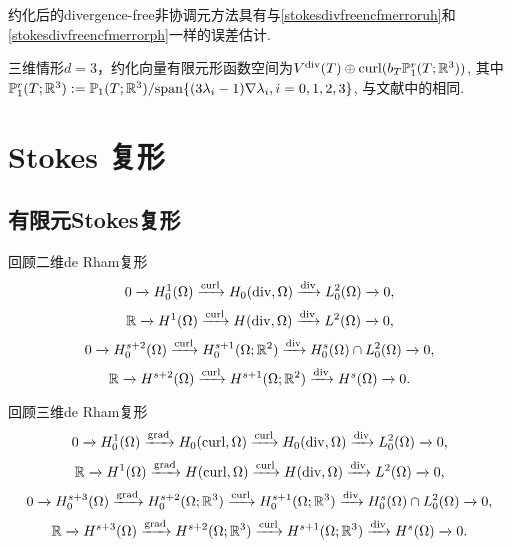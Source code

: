 约化后的divergence-free非协调元方法具有与\eqref{stokesdivfreencfmerroruh}和\eqref{stokesdivfreencfmerrorph}一样的误差估计.

三维情形$d=3$，约化向量有限元形函数空间为$V^{\operatorname{div}}(T)\oplus\operatorname{curl}(b_T\mathbb P_1^r(T;\mathbb R^3))$, 其中$\mathbb P_1^r(T;\mathbb R^3):=\mathbb P_1(T;\mathbb R^3)/{\rm span}\{(3\lambda_i-1)\nabla\lambda_i, i=0,1,2,3\}$, 与文献\cite{XieXuXue2008}中的相同.




\section{ Stokes 复形}
\subsection{有限元Stokes复形}
回顾二维de Rham复形
\begin{equation*}
0\xrightarrow{} H_0^1(\Omega)\xrightarrow{\operatorname{curl}} H_0(\operatorname{div},\Omega)\xrightarrow{\operatorname{div}} L_0^2(\Omega)\xrightarrow{}0,
\end{equation*}
\begin{equation*}
\mathbb R\xrightarrow{} H^1(\Omega)\xrightarrow{\operatorname{curl}} H(\operatorname{div},\Omega)\xrightarrow{\operatorname{div}} L^2(\Omega)\xrightarrow{}0,
\end{equation*}
\begin{equation*}
0\xrightarrow{} H_0^{s+2}(\Omega)\xrightarrow{\operatorname{curl}} H_0^{s+1}(\Omega;\mathbb R^2)\xrightarrow{\operatorname{div}} H_0^s(\Omega)\cap L_0^2(\Omega)\xrightarrow{}0,
\end{equation*}
\begin{equation*}
\mathbb R\xrightarrow{} H^{s+2}(\Omega)\xrightarrow{\operatorname{curl}} H^{s+1}(\Omega;\mathbb R^2)\xrightarrow{\operatorname{div}} H^s(\Omega)\xrightarrow{}0.
\end{equation*}


回顾三维de Rham复形
\begin{equation*}
0\xrightarrow{} H_0^1(\Omega)\xrightarrow{\operatorname{grad}} H_0(\operatorname{curl},\Omega)\xrightarrow{\operatorname{curl}} H_0(\operatorname{div},\Omega)\xrightarrow{\operatorname{div}} L_0^2(\Omega)\xrightarrow{}0,
\end{equation*}
\begin{equation*}
\mathbb R\xrightarrow{} H^1(\Omega)\xrightarrow{\operatorname{grad}} H(\operatorname{curl},\Omega)\xrightarrow{\operatorname{curl}} H(\operatorname{div},\Omega)\xrightarrow{\operatorname{div}} L^2(\Omega)\xrightarrow{}0,
\end{equation*}
\begin{equation*}
0\xrightarrow{} H_0^{s+3}(\Omega)\xrightarrow{\operatorname{grad}} H_0^{s+2}(\Omega;\mathbb R^3)\xrightarrow{\operatorname{curl}} H_0^{s+1}(\Omega;\mathbb R^3)\xrightarrow{\operatorname{div}} H_0^{s}(\Omega)\cap L_0^2(\Omega)\xrightarrow{}0,
\end{equation*}
\begin{equation*}
\mathbb R\xrightarrow{} H^{s+3}(\Omega)\xrightarrow{\operatorname{grad}} H^{s+2}(\Omega;\mathbb R^3)\xrightarrow{\operatorname{curl}} H^{s+1}(\Omega;\mathbb R^3)\xrightarrow{\operatorname{div}} H^{s}(\Omega)\xrightarrow{}0.
\end{equation*}

